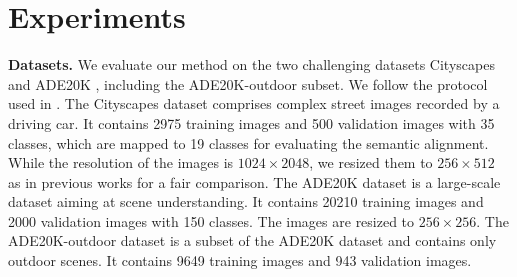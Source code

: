 \documentclass{bmvc2k}
\begin{document}
\section{Experiments}
\label{sec:exp}


\textbf{Datasets.} We evaluate our method on the two challenging datasets Cityscapes \cite{cordts2016cityscapes}
and ADE20K \cite{zhou2017scene}, including the ADE20K-outdoor subset. We follow the protocol used in \cite{park2019semantic,schonfeld_sushko_iclr2021}. The Cityscapes dataset comprises complex street images recorded by a driving car. It contains 2975 training images and 500 validation images with 35 classes, which are mapped to 19 classes for evaluating the semantic alignment. While the resolution of the images is $1024\times2048$, we resized them to $256\times512$ as in previous works for a fair comparison. The ADE20K dataset is a large-scale dataset aiming at scene understanding. It contains 20210 training images and 2000 validation images with 150 classes. The images are resized to $256\times256$. The ADE20K-outdoor dataset is a subset of the ADE20K dataset and contains only outdoor scenes. It contains 9649 training images and 943 validation images.
\end{document}
